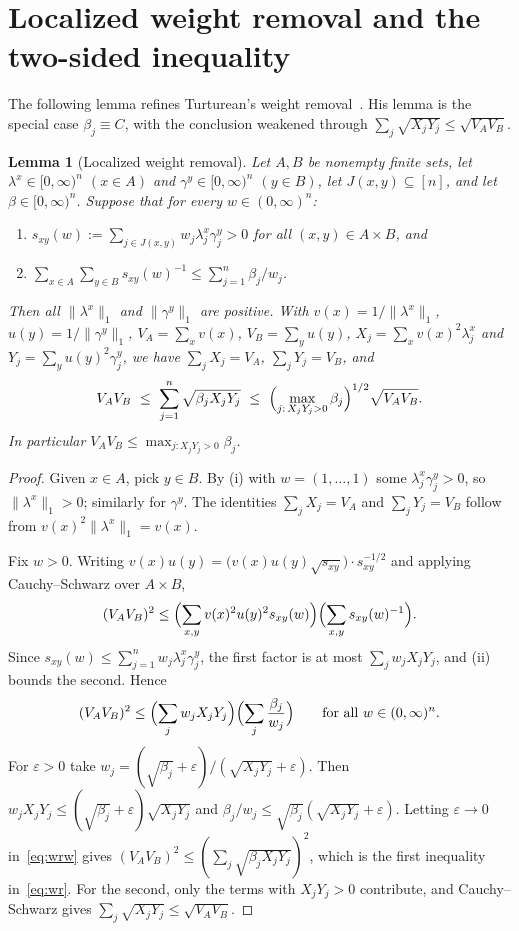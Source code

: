 \documentclass[11pt]{article}
\numberwithin{equation}{section}
\newtheorem{lemma}[theorem]{Lemma}
\theoremstyle{definition}
\theoremstyle{remark}
\newcommand{\1}{\mathbf 1}
\newcommand{\nrm}[1]{\lVert #1\rVert_1}
\begin{document}
\section{Localized weight removal and the two-sided inequality}

The following lemma refines Turturean's weight removal~\cite[Lemma~5.3]{Tur26}. His lemma is the special case $\beta_j\equiv C$, with the conclusion weakened through $\sum_j\sqrt{X_jY_j}\le\sqrt{V_AV_B}$.

\begin{lemma}[Localized weight removal]\label{lem:wr}
Let $A,B$ be nonempty finite sets, let $\lambda^x\in[0,\infty)^n$ $(x\in A)$ and $\gamma^y\in[0,\infty)^n$ $(y\in B)$, let $J(x,y)\subseteq[n]$, and let $\beta\in[0,\infty)^n$. Suppose that for every $w\in(0,\infty)^n$:
\begin{enumerate}[label=(\roman*),itemsep=0pt]
\item $s_{xy}(w):=\sum_{j\in J(x,y)}w_j\lambda^x_j\gamma^y_j>0$ for all $(x,y)\in A\times B$, and
\item $\sum_{x\in A}\sum_{y\in B}s_{xy}(w)^{-1}\le\sum_{j=1}^n\beta_j/w_j$.
\end{enumerate}
Then all $\nrm{\lambda^x}$ and $\nrm{\gamma^y}$ are positive. With $v(x)=1/\nrm{\lambda^x}$, $u(y)=1/\nrm{\gamma^y}$, $V_A=\sum_xv(x)$, $V_B=\sum_yu(y)$, $X_j=\sum_xv(x)^2\lambda^x_j$ and $Y_j=\sum_yu(y)^2\gamma^y_j$, we have $\sum_jX_j=V_A$, $\sum_jY_j=V_B$, and
\begin{equation}\label{eq:wr}
V_AV_B\ \le\ \sum_{j=1}^n\sqrt{\beta_jX_jY_j}\ \le\ \Bigl(\max_{j:\,X_jY_j>0}\beta_j\Bigr)^{1/2}\sqrt{V_AV_B}.
\end{equation}
In particular $V_AV_B\le\max_{j:X_jY_j>0}\beta_j$.
\end{lemma}

\begin{proof}
Given $x\in A$, pick $y\in B$. By (i) with $w=(1,\dots,1)$ some $\lambda^x_j\gamma^y_j>0$, so $\nrm{\lambda^x}>0$; similarly for $\gamma^y$. The identities $\sum_jX_j=V_A$ and $\sum_jY_j=V_B$ follow from $v(x)^2\nrm{\lambda^x}=v(x)$.

Fix $w>0$. Writing $v(x)u(y)=\bigl(v(x)u(y)\sqrt{s_{xy}}\bigr)\cdot s_{xy}^{-1/2}$ and applying Cauchy--Schwarz over $A\times B$,
\[
(V_AV_B)^2\le\Bigl(\sum_{x,y}v(x)^2u(y)^2s_{xy}(w)\Bigr)\Bigl(\sum_{x,y}s_{xy}(w)^{-1}\Bigr).
\]
Since $s_{xy}(w)\le\sum_{j=1}^nw_j\lambda^x_j\gamma^y_j$, the first factor is at most $\sum_jw_jX_jY_j$, and (ii) bounds the second. Hence
\begin{equation}\label{eq:wrw}
(V_AV_B)^2\le\Bigl(\sum_jw_jX_jY_j\Bigr)\Bigl(\sum_j\frac{\beta_j}{w_j}\Bigr)\qquad\text{for all }w\in(0,\infty)^n.
\end{equation}
For $\varepsilon>0$ take $w_j=(\sqrt{\beta_j}+\varepsilon)/(\sqrt{X_jY_j}+\varepsilon)$. Then $w_jX_jY_j\le(\sqrt{\beta_j}+\varepsilon)\sqrt{X_jY_j}$ and $\beta_j/w_j\le\sqrt{\beta_j}(\sqrt{X_jY_j}+\varepsilon)$. Letting $\varepsilon\to0$ in~\eqref{eq:wrw} gives $(V_AV_B)^2\le(\sum_j\sqrt{\beta_jX_jY_j})^2$, which is the first inequality in~\eqref{eq:wr}. For the second, only the terms with $X_jY_j>0$ contribute, and Cauchy--Schwarz gives $\sum_j\sqrt{X_jY_j}\le\sqrt{V_AV_B}$.
\end{proof}
\end{document}
